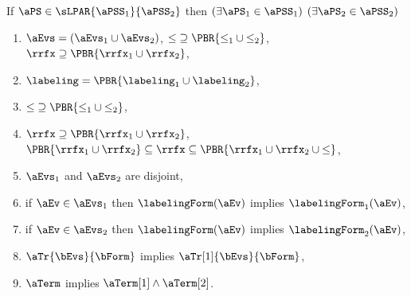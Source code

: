 \begin{definition}
  If $\aPS \in \sLPAR{\aPSS_1}{\aPSS_2}$ then  
  $(\exists\aPS_1\in\aPSS_1)$ $(\exists\aPS_2\in\aPSS_2)$
  \begin{multicols}{2}
    \begin{enumerate}[topsep=0pt]
    \item \label{par-E}
      $\aEvs = (\aEvs_1\cup\aEvs_2)$,
      ${\le}\supseteq\PBR{{\le_1}\cup{\le_2}}$, 
      ${\rrfx}\supseteq\PBR{{\rrfx_1}\cup{\rrfx_2}}$,
    \item \label{par-lambda}
      ${\labeling}=\PBR{{\labeling_1}\cup {\labeling_2}}$, 
    \item \label{par-le}
      ${\le}\supseteq\PBR{{\le_1}\cup{\le_2}}$, 
    \item \label{par-rf}
      ${\rrfx}\supseteq\PBR{{\rrfx_1}\cup{\rrfx_2}}$,\\
      $\PBR{{\rrfx_1}\cup{\rrfx_2}}\subseteq{\rrfx}\subseteq\PBR{{\rrfx_1}\cup{\rrfx_2}\cup{\le}}$,
    \item \label{par-disjoint}
      $\aEvs_1$ and $\aEvs_2$ are disjoint,
      \columnbreak
    \item \label{par-kappa1}
      if $\aEv\in\aEvs_1$ then $\labelingForm(\aEv)$ implies $\labelingForm_1(\aEv)$,
    \item \label{par-kappa2}
      if $\aEv\in\aEvs_2$ then $\labelingForm(\aEv)$ implies $\labelingForm_2(\aEv)$,
    \item \label{par-tau}
      $\aTr{\bEvs}{\bForm}$ implies $\aTr[1]{\bEvs}{\bForm}$,
    \item \label{par-term}
      $\aTerm$ implies $\aTerm[1]\land\aTerm[2]$.
    \end{enumerate}
  \end{multicols}
  \medskip


\end{definition}
